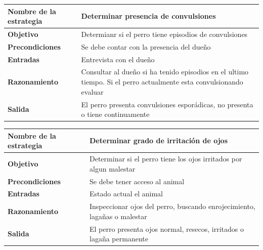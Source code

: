 \documentclass[a4paper,table,xcdraw]{article}
\begin{document}
\begin{longtable}{|m{100pt}|m{300pt}|}
\hline
\textbf{Nombre de la estrategia} & Determinar presencia de convulsiones                                                                               \\ \hline
\endhead
%
\textbf{Objetivo}                & Determianr si el perro tiene episodios de convulsiones                                                             \\ \hline
\textbf{Precondiciones}          & Se debe contar con la presencia del dueño                                                                          \\ \hline
\textbf{Entradas}                & Entrevista con el dueño                                                                                            \\ \hline
\textbf{Razonamiento}            & Consultar al dueño si ha tenido episodios en el ultimo tiempo. Si el perro actualmente esta convulsionando evaluar \\ \hline
\textbf{Salida}                  & El perro presenta convulsiones esporádicas, no presenta o tiene continuamente                                      \\ \hline
\end{longtable}

\begin{longtable}{|l|l|}
\hline
\textbf{Nombre de la estrategia} & Determinar grado de irritación de ojos                                   \\ \hline
\endhead
%
\textbf{Objetivo}                & Determinar si el perro tiene los ojos irritados por algun malestar       \\ \hline
\textbf{Precondiciones}          & Se debe tener acceso al animal                                           \\ \hline
\textbf{Entradas}                & Estado actual el animal                                                  \\ \hline
\textbf{Razonamiento}            & Inspeccionar ojos del perro, buscando enrojecimiento, lagañas o malestar \\ \hline
\textbf{Salida}                  & El perro presenta ojos normal, resecos, irritados o lagaña permanente    \\ \hline
\end{longtable}
\end{document}
